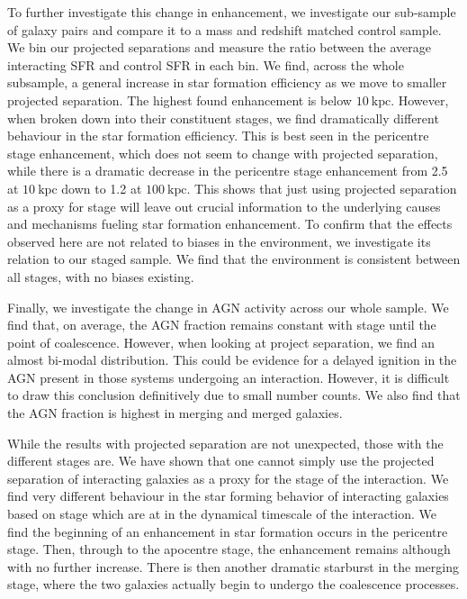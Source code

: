 To further investigate this change in enhancement, we investigate our sub-sample of galaxy pairs and compare it to a mass and redshift matched control sample. We bin our projected separations and measure the ratio between the average interacting SFR and control SFR in each bin. We find, across the whole subsample, a general increase in star formation efficiency as we move to smaller projected separation. The highest found enhancement is below $10~\mathrm{kpc}$. However, when broken down into their constituent stages, we find dramatically different behaviour in the star formation efficiency. This is best seen in the pericentre stage enhancement, which does not seem to change with projected separation, while there is a dramatic decrease in the pericentre stage enhancement from 2.5 at $10~\mathrm{kpc}$ down to 1.2 at $100~\mathrm{kpc}$. This shows that just using projected separation as a proxy for stage will leave out crucial information to the underlying causes and mechanisms fueling star formation enhancement. To confirm that the effects observed here are not related to biases in the environment, we investigate its relation to our staged sample. We find that the environment is consistent between all stages, with no biases existing.

Finally, we investigate the change in AGN activity across our whole sample. We find that, on average, the AGN fraction remains constant with stage until the point of coalescence. However, when looking at project separation, we find an almost bi-modal distribution. This could be evidence for a delayed ignition in the AGN present in those systems undergoing an interaction. However, it is difficult to draw this conclusion definitively due to small number counts. We also find that the AGN fraction is highest in merging and merged galaxies.

While the results with projected separation are not unexpected, those with the different stages are. We have shown that one cannot simply use the projected separation of interacting galaxies as a proxy for the stage of the interaction. We find very different behaviour in the star forming behavior of interacting galaxies based on stage which are at in the dynamical timescale of the interaction. We find the beginning of an enhancement in star formation occurs in the pericentre stage. Then, through to the apocentre stage, the enhancement remains although with no further increase. There is then another dramatic starburst in the merging stage, where the two galaxies actually begin to undergo the coalescence processes.

